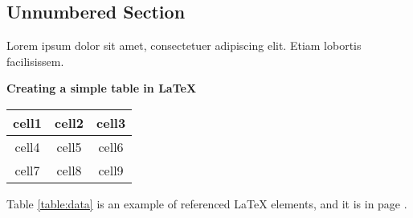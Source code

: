 \documentclass[12pt, letterpaper]{article}
\begin{document}
\subsection*{Unnumbered Section}
Lorem ipsum dolor sit amet, consectetuer adipiscing elit. Etiam lobortis facilisissem.

\begin{comment}
The basic levels of depth are listed below:
-1 \part{part}
0 \chapter{chapter}
1 \section{section}
2 \subsection{subsection}
3 \subsubsection{subsubsection}
4 \paragraph{paragraph}
5 \subparagraph{subparagraph}
\end{comment}

\textbf{Creating a simple table in LaTeX}

\begin{table}
\begin{center}
\begin{tabular}{| c | c | c |}		%
	\hline	%
	cell1 & cell2 & cell3 \\
	\hline
	cell4 & cell5 & cell6 \\
	\hline\hline
	cell7 & cell8 & cell9 \\
	\hline
\end{tabular}
\end{center}
\end{table}

Table \ref{table:data} is an example of referenced \LaTeX{} elements, and it is in page \pageref{table:data}.
\end{document}
